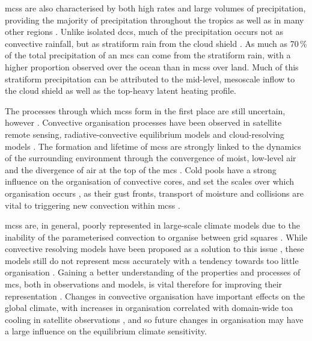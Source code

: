 \acrshort{mcs}s are also characterised by both high rates and large volumes of precipitation, providing the majority of precipitation throughout the tropics as well as in many other regions \citep{feng_global_2021}.
Unlike isolated \acrshort{dcc}s, much of the precipitation occurs not as convective rainfall, but as stratiform rain from the cloud shield \citep{schumacher_stratiform_2003}.
As much as 70\,\% of the total precipitation of an \acrshort{mcs} can come from the stratiform rain, with a higher proportion observed over the ocean than in \acrshort{mcs}s over land.
Much of this stratiform precipitation can be attributed to the mid-level, mesoscale inflow to the cloud shield as well as the top-heavy latent heating profile.

The processes through which \acrshort{mcs}s form in the first place are still uncertain, however \citep{houze_100_2018}.
Convective organisation processes have been observed in satellite remote sensing, radiative-convective equilibrium models and cloud-resolving models \citep{holloway_observing_2017}. 
The formation and lifetime of \acrshort{mcs}s are strongly linked to the dynamics of the surrounding environment through the convergence of moist, low-level air and the divergence of air at the top of the \acrshort{mcs}  \citep{houze_chapter_2014}. 
Cold pools have a strong influence on the organisation of convective cores, and set the scales over which organisation occurs \citep{jeevanjee_convective_2013}, as their gust fronts, transport of moisture and collisions  are vital to triggering new convection within \acrshort{mcs}s \citep{feng_mechanisms_2015}.

\acrshort{mcs}s are, in general, poorly represented in large-scale climate models due to the inability of the parameterised convection to organise between grid squares \citep{houze_100_2018}.
While convective resolving models have been proposed as a solution to this issue \citep{stevens_added_2020}, these models still do not represent \acrshort{mcs}s accurately with a tendency towards too little organisation \citep{prein_sensitivity_2021}.
Gaining a better understanding of the properties and processes of \acrshort{mcs}, both in observations and models, is vital therefore for improving their representation \citep{feng_mesoscale_2023}.
Changes in convective organisation have important effects on the global climate, with increases in organisation correlated with domain-wide \acrshort{toa} cooling in satellite observations \citep{bony_observed_2020}, and so future changes in organisation may have a large influence on the equilibrium climate sensitivity.

